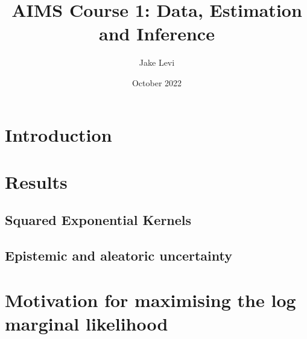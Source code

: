 \documentclass{article}
\title{AIMS Course 1: Data, Estimation and Inference}
\author{Jake Levi}
\date{October 2022}
\begin{document}
\maketitle
\section{Introduction} \label{section:intro}


\section{Results}
\subsection{Squared Exponential Kernels}





\pagebreak
\subsection{Epistemic and aleatoric uncertainty}




\appendix
\section{Motivation for maximising the log marginal likelihood}\label{appendix:why_lml}
\end{document}
